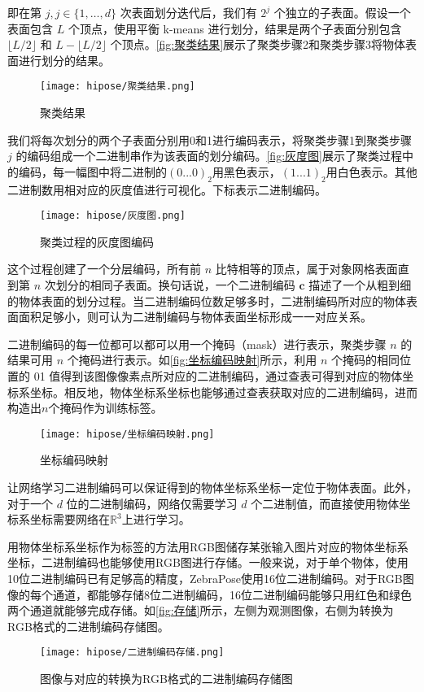 即在第 $j, j \in \{1, \ldots, d\}$ 次表面划分迭代后，我们有 $2^{j}$ 个独立的子表面。假设一个表面包含 $L$ 个顶点，使用平衡 k-means 进行划分，结果是两个子表面分别包含 $\lfloor L/2 \rfloor$ 和 $L-\lfloor L/2 \rfloor$ 个顶点。\autoref{fig:聚类结果}展示了聚类步骤2和聚类步骤3将物体表面进行划分的结果。

\begin{figure}[htbp]
    \centering
    \texttt{[image: hipose/聚类结果.png]}
    \caption{聚类结果}
    \label{fig:聚类结果}
\end{figure}

我们将每次划分的两个子表面分别用0和1进行编码表示，将聚类步骤1到聚类步骤 $j$ 的编码组成一个二进制串作为该表面的划分编码。\autoref{fig:灰度图}展示了聚类过程中的编码，每一幅图中将二进制的$(0...0)_2$用黑色表示，$(1...1)_2$用白色表示。其他二进制数用相对应的灰度值进行可视化。下标表示二进制编码。

\begin{figure}[ht]
    \centering
    \texttt{[image: hipose/灰度图.png]}
    \caption{聚类过程的灰度图编码}
    \label{fig:灰度图}
\end{figure}

这个过程创建了一个分层编码，所有前 $n$ 比特相等的顶点，属于对象网格表面直到第 $n$ 次划分的相同子表面。换句话说，一个二进制编码 $\mathbf{c}$ 描述了一个从粗到细的物体表面的划分过程。当二进制编码位数足够多时，二进制编码所对应的物体表面面积足够小，则可认为二进制编码与物体表面坐标形成一一对应关系。

二进制编码的每一位都可以都可以用一个掩码（mask）进行表示，聚类步骤 $n$ 的结果可用 $n$ 个掩码进行表示。如\autoref{fig:坐标编码映射}所示，利用 $n$ 个掩码的相同位置的 01 值得到该图像像素点所对应的二进制编码，通过查表可得到对应的物体坐标系坐标。相反地，物体坐标系坐标也能够通过查表获取对应的二进制编码，进而构造出$n$个掩码作为训练标签。

\begin{figure}[ht]
    \centering
    \texttt{[image: hipose/坐标编码映射.png]}
    \caption{坐标编码映射}
    \label{fig:坐标编码映射}
\end{figure}

\par 让网络学习二进制编码可以保证得到的物体坐标系坐标一定位于物体表面。此外，对于一个 $d$ 位的二进制编码，网络仅需要学习 $d$ 个二进制值，而直接使用物体坐标系坐标需要网络在$\mathbb{R}^3$上进行学习。

用物体坐标系坐标作为标签的方法用RGB图储存某张输入图片对应的物体坐标系坐标，二进制编码也能够使用RGB图进行存储。一般来说，对于单个物体，使用10位二进制编码已有足够高的精度，ZebraPose使用16位二进制编码。对于RGB图像的每个通道，都能够存储8位二进制编码，16位二进制编码能够只用红色和绿色两个通道就能够完成存储。如\autoref{fig:存储}所示，左侧为观测图像，右侧为转换为RGB格式的二进制编码存储图。

\begin{figure}[ht]
    \centering
    \texttt{[image: hipose/二进制编码存储.png]}
    \caption{图像与对应的转换为RGB格式的二进制编码存储图}
    \label{fig:存储}
\end{figure}